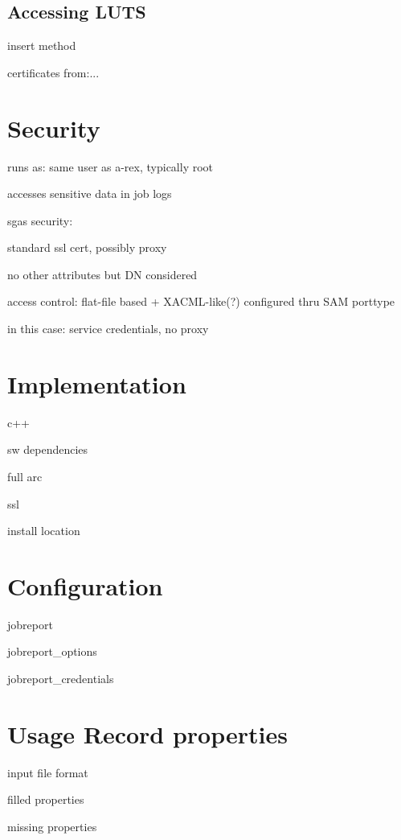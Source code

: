 \documentclass{article}                            %
\begin{document}
\subsection{Accessing LUTS}

insert method

certificates from:...

\section{Security}
  runs as: same user as a-rex, typically root

  accesses sensitive data in job logs

  sgas security: 

    standard ssl cert, possibly proxy

    no other attributes but DN considered

    access control: flat-file based + XACML-like(?) configured thru
    SAM porttype

  in this case: service credentials, no proxy

\section{Implementation}
  c++

  sw dependencies

    full arc

    ssl

  install location

\appendix

\section{Configuration}
\label{config}
  jobreport

  jobreport\_options

  jobreport\_credentials

\section{Usage Record properties}
\label{log2ur}
  input file format

  filled properties

  missing properties


\end{document}
